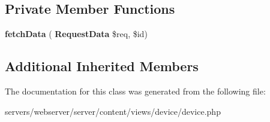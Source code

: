 \subsection*{Private Member Functions}
\begin{DoxyCompactItemize}
\item 
\mbox{\label{class_lora_1_1_content_1_1_content___device_a9ff3b3604c524ec2caf3e201ca0ca298}} 
{\bfseries fetch\+Data} (\textbf{ Request\+Data} \$req, \$id)
\end{DoxyCompactItemize}
\subsection*{Additional Inherited Members}


The documentation for this class was generated from the following file\+:\begin{DoxyCompactItemize}
\item 
servers/webserver/server/content/views/device/device.\+php\end{DoxyCompactItemize}
